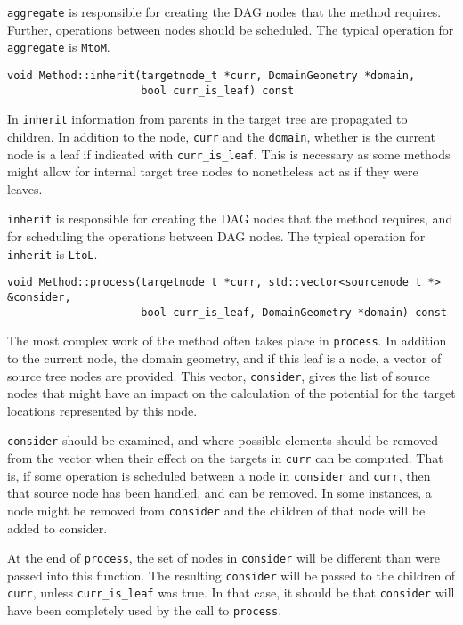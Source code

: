 \texttt{aggregate} is responsible for creating the DAG nodes that the method
requires. Further, operations between nodes should be scheduled. The typical
operation for \texttt{aggregate} is \texttt{MtoM}.

\begin{lstlisting}
void Method::inherit(targetnode_t *curr, DomainGeometry *domain,
                     bool curr_is_leaf) const
\end{lstlisting}

\noindent
In \texttt{inherit} information from parents in the target tree are propagated
to children. In addition to the node, \texttt{curr} and the \texttt{domain},
whether is the current node is a leaf if indicated with
\texttt{curr\_is\_leaf}. This is necessary as some methods might allow for
internal target tree nodes to nonetheless act as if they were leaves.

\texttt{inherit} is responsible for creating the DAG nodes that the method
requires, and for scheduling the operations between DAG nodes. The typical
operation for \texttt{inherit} is \texttt{LtoL}.


\begin{lstlisting}
void Method::process(targetnode_t *curr, std::vector<sourcenode_t *> &consider,
                     bool curr_is_leaf, DomainGeometry *domain) const
\end{lstlisting}

\noindent
The most complex work of the method often takes place in \texttt{process}. In
addition to the current node, the domain geometry, and if this leaf is a node,
a vector of source tree nodes are provided. This vector, \texttt{consider},
gives the list of source nodes that might have an impact on the calculation of
the potential for the target locations represented by this node.

\texttt{consider} should be examined, and where possible elements should be
removed from the vector when their effect on the targets in \texttt{curr} can
be computed. That is, if some operation is scheduled between a node in
\texttt{consider} and \texttt{curr}, then that source node has been handled,
and can be removed. In some instances, a node might be removed from
\texttt{consider} and the children of that node will be added to consider.

At the end of \texttt{process}, the set of nodes in \texttt{consider} will be
different than were passed into this function. The resulting \texttt{consider}
will be passed to the children of \texttt{curr}, unless \texttt{curr\_is\_leaf}
was true. In that case, it should be that \texttt{consider} will have been
completely used by the call to \texttt{process}.

